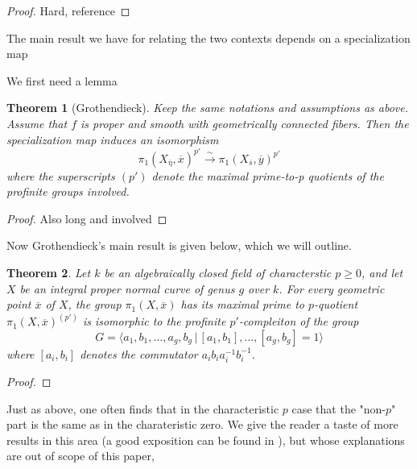 \documentclass{article}
\newtheorem{theorem}{Theorem}[section]
\theoremstyle{definition}
\theoremstyle{remark}
\begin{document}
 \begin{proof}
	 Hard,  reference
 \end{proof}
 
 The main result we have for relating the two contexts depends on a specialization map 

 We first need a lemma


\begin{theorem}[Grothendieck]
	Keep the same notations and assumptions as above.
	Assume that $f$ is proper and smooth with geometrically connected fibers.
	Then the specialization map induces an isomorphism 
	\[\pi_1(X_{\overline{\eta}}, \overline{x})^{p'} \xrightarrow{\sim} \pi_1(X_{\overline{s}}, \overline{y})^{p'}\]
	where the superscripts $(p')$ denote the maximal prime-to-p quotients of the profinite groups involved.
	
\end{theorem}

 \begin{proof}
	 Also long and involved 
 \end{proof}
 

 Now Grothendieck's main result is given below, which we will outline.
\begin{theorem}
	Let $k$ be an algebraically closed field of characterstic $p \geq 0$, and let $X$ be an integral proper normal curve of genus $g$ over $k$.
	For every geometric point $\overline{x}$ of $X$, the group $\pi_1(X, \overline{x})$ has its maximal prime to $p$-quotient $\pi_1(X, \overline{x})^{(p')}$ is isomorphic to the profinite $p'$-compleiton of the group
	\[G = \langle a_1, b_1, \dots, a_g, b_g \,|\, [a_1,b_1], \dots, [a_g, b_g] = 1\rangle\]
	where $[a_i, b_i]$ denotes the commutator $a_i b_i a_i^{-1} b_i^{-1}$.
\end{theorem}

\begin{proof}
\end{proof}

Just as above, one often finds that in the characteristic $p$ case that the "non-$p$" part is the same as in the charateristic zero.
We give the reader a taste of more results in this area (a good exposition can be found in  \cite{abhyankar}), but whose explanations are out of scope of this paper, 


\newpage


\end{document}
